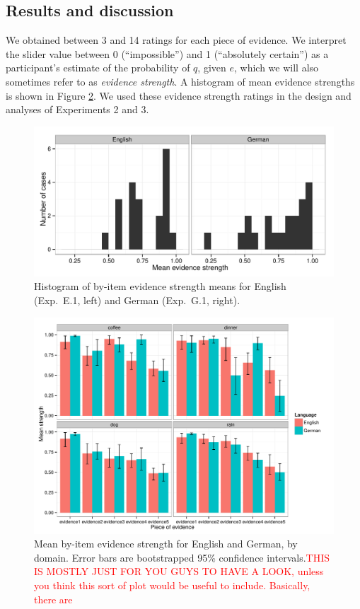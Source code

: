 \documentclass[11pt]{article}
\newcommand{\red}[1]{\textcolor{Red}{#1}}
\newcommand{\figref}[1]{Figure \ref{#1}}
\begin{document}
\subsection{Results and discussion}

We obtained between 3 and 14 ratings for each piece of evidence. We interpret the slider value between 0 (``impossible'') and 1 (``absolutely certain'') as a participant's estimate of the probability of $q$, given $e$, which we will also sometimes refer to as  \emph{evidence strength}. A histogram of mean evidence strengths is shown in \figref{fig:evidencestrength}.  We used these evidence strength ratings in the design and analyses of Experiments 2 and 3.

\begin{figure}
\centering
\includegraphics[width=.9\textwidth]{pics/evidencestrength-histograms}
\caption{Histogram of by-item evidence strength means  for English (Exp.~E.1, left) and German (Exp.~G.1, right).}
\label{fig:evidencestrength}
\end{figure}

\begin{figure}
\centering
\includegraphics[width=\textwidth]{pics/mean-evidencestrength-byitem}
\caption{Mean by-item evidence strength for English and German, by domain. Error bars are bootstrapped 95\% confidence intervals.\red{THIS IS MOSTLY JUST FOR YOU GUYS TO HAVE A LOOK, unless you think this sort of plot would be useful to include. Basically, there are }}
\label{fig:evidencestrength}
\end{figure}
\end{document}
